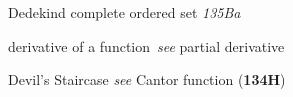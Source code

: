 \indexmedskip




























{Dedekind complete }
ordered set {\it 135Ba}





















































derivative of a function\ 
  {\it see} partial derivative





















Devil's Staircase {\it see} Cantor function ({\bf 134H})












